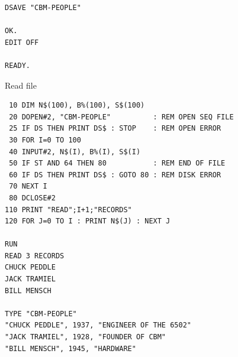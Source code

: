 \begin{description}[leftmargin=2cm,style=nextline]
\begin{tcolorbox}[colback=black,coltext=white]
\begin{verbatim}
DSAVE "CBM-PEOPLE"

OK.
EDIT OFF

READY.
\end{verbatim}
\end{tcolorbox}
   
                  Read file

\begin{tcolorbox}[colback=black,coltext=white]
\verbatimfont{\codefont}
\begin{verbatim}
 10 DIM N$(100), B%(100), S$(100)
 20 DOPEN#2, "CBM-PEOPLE"          : REM OPEN SEQ FILE
 25 IF DS THEN PRINT DS$ : STOP    : REM OPEN ERROR
 30 FOR I=0 TO 100
 40 INPUT#2, N$(I), B%(I), S$(I)
 50 IF ST AND 64 THEN 80           : REM END OF FILE
 60 IF DS THEN PRINT DS$ : GOTO 80 : REM DISK ERROR
 70 NEXT I
 80 DCLOSE#2
110 PRINT "READ";I+1;"RECORDS"
120 FOR J=0 TO I : PRINT N$(J) : NEXT J

RUN
READ 3 RECORDS
CHUCK PEDDLE
JACK TRAMIEL
BILL MENSCH

TYPE "CBM-PEOPLE"
"CHUCK PEDDLE", 1937, "ENGINEER OF THE 6502"
"JACK TRAMIEL", 1928, "FOUNDER OF CBM"
"BILL MENSCH", 1945, "HARDWARE"
\end{verbatim}
\end{tcolorbox}
\end{description}


\newpage
